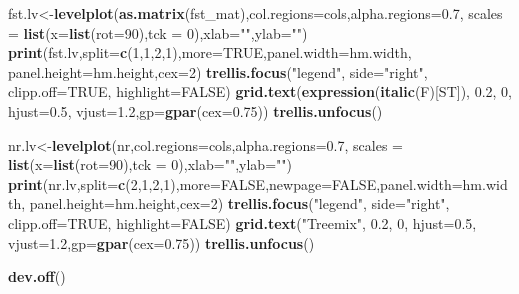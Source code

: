 \documentclass[11pt,]{article}
\newenvironment{Shaded}{\begin{snugshade}}{\end{snugshade}}
\newcommand{\KeywordTok}[1]{\textcolor[rgb]{0.13,0.29,0.53}{\textbf{#1}}}
\newcommand{\DataTypeTok}[1]{\textcolor[rgb]{0.13,0.29,0.53}{#1}}
\newcommand{\DecValTok}[1]{\textcolor[rgb]{0.00,0.00,0.81}{#1}}
\newcommand{\FloatTok}[1]{\textcolor[rgb]{0.00,0.00,0.81}{#1}}
\newcommand{\StringTok}[1]{\textcolor[rgb]{0.31,0.60,0.02}{#1}}
\newcommand{\OtherTok}[1]{\textcolor[rgb]{0.56,0.35,0.01}{#1}}
\newcommand{\NormalTok}[1]{#1}
\begin{document}
\begin{Shaded}
\begin{Highlighting}[]
\NormalTok{fst.lv<-}\KeywordTok{levelplot}\NormalTok{(}\KeywordTok{as.matrix}\NormalTok{(fst_mat),}\DataTypeTok{col.regions=}\NormalTok{cols,}\DataTypeTok{alpha.regions=}\FloatTok{0.7}\NormalTok{,}
                  \DataTypeTok{scales =} \KeywordTok{list}\NormalTok{(}\DataTypeTok{x=}\KeywordTok{list}\NormalTok{(}\DataTypeTok{rot=}\DecValTok{90}\NormalTok{),}\DataTypeTok{tck =} \DecValTok{0}\NormalTok{),}\DataTypeTok{xlab=}\StringTok{""}\NormalTok{,}\DataTypeTok{ylab=}\StringTok{""}\NormalTok{)}
\KeywordTok{print}\NormalTok{(fst.lv,}\DataTypeTok{split=}\KeywordTok{c}\NormalTok{(}\DecValTok{1}\NormalTok{,}\DecValTok{1}\NormalTok{,}\DecValTok{2}\NormalTok{,}\DecValTok{1}\NormalTok{),}\DataTypeTok{more=}\OtherTok{TRUE}\NormalTok{,}\DataTypeTok{panel.width=}\NormalTok{hm.width,}
      \DataTypeTok{panel.height=}\NormalTok{hm.height,}\DataTypeTok{cex=}\DecValTok{2}\NormalTok{)}
\KeywordTok{trellis.focus}\NormalTok{(}\StringTok{"legend"}\NormalTok{, }\DataTypeTok{side=}\StringTok{"right"}\NormalTok{, }\DataTypeTok{clipp.off=}\OtherTok{TRUE}\NormalTok{, }\DataTypeTok{highlight=}\OtherTok{FALSE}\NormalTok{)}
\KeywordTok{grid.text}\NormalTok{(}\KeywordTok{expression}\NormalTok{(}\KeywordTok{italic}\NormalTok{(F)[ST]), }\FloatTok{0.2}\NormalTok{, }\DecValTok{0}\NormalTok{, }\DataTypeTok{hjust=}\FloatTok{0.5}\NormalTok{, }\DataTypeTok{vjust=}\FloatTok{1.2}\NormalTok{,}\DataTypeTok{gp=}\KeywordTok{gpar}\NormalTok{(}\DataTypeTok{cex=}\FloatTok{0.75}\NormalTok{))}
\KeywordTok{trellis.unfocus}\NormalTok{()}

\NormalTok{nr.lv<-}\KeywordTok{levelplot}\NormalTok{(nr,}\DataTypeTok{col.regions=}\NormalTok{cols,}\DataTypeTok{alpha.regions=}\FloatTok{0.7}\NormalTok{,}
                 \DataTypeTok{scales =} \KeywordTok{list}\NormalTok{(}\DataTypeTok{x=}\KeywordTok{list}\NormalTok{(}\DataTypeTok{rot=}\DecValTok{90}\NormalTok{),}\DataTypeTok{tck =} \DecValTok{0}\NormalTok{),}\DataTypeTok{xlab=}\StringTok{""}\NormalTok{,}\DataTypeTok{ylab=}\StringTok{""}\NormalTok{)}
\KeywordTok{print}\NormalTok{(nr.lv,}\DataTypeTok{split=}\KeywordTok{c}\NormalTok{(}\DecValTok{2}\NormalTok{,}\DecValTok{1}\NormalTok{,}\DecValTok{2}\NormalTok{,}\DecValTok{1}\NormalTok{),}\DataTypeTok{more=}\OtherTok{FALSE}\NormalTok{,}\DataTypeTok{newpage=}\OtherTok{FALSE}\NormalTok{,}\DataTypeTok{panel.width=}\NormalTok{hm.width,}
      \DataTypeTok{panel.height=}\NormalTok{hm.height,}\DataTypeTok{cex=}\DecValTok{2}\NormalTok{)}
\KeywordTok{trellis.focus}\NormalTok{(}\StringTok{"legend"}\NormalTok{, }\DataTypeTok{side=}\StringTok{"right"}\NormalTok{, }\DataTypeTok{clipp.off=}\OtherTok{TRUE}\NormalTok{, }\DataTypeTok{highlight=}\OtherTok{FALSE}\NormalTok{)}
\KeywordTok{grid.text}\NormalTok{(}\StringTok{"Treemix"}\NormalTok{, }\FloatTok{0.2}\NormalTok{, }\DecValTok{0}\NormalTok{, }\DataTypeTok{hjust=}\FloatTok{0.5}\NormalTok{, }\DataTypeTok{vjust=}\FloatTok{1.2}\NormalTok{,}\DataTypeTok{gp=}\KeywordTok{gpar}\NormalTok{(}\DataTypeTok{cex=}\FloatTok{0.75}\NormalTok{))}
\KeywordTok{trellis.unfocus}\NormalTok{()}

\KeywordTok{dev.off}\NormalTok{()}
\end{Highlighting}
\end{Shaded}
\end{document}
